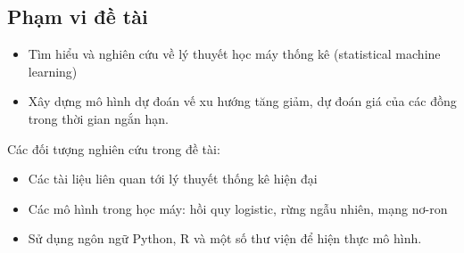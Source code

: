 \subsection{Phạm vi đề tài}
\begin{itemize}
\item Tìm hiểu và nghiên cứu về lý thuyết học máy thống kê (statistical machine learning)
\item Xây dựng mô hình dự đoán vế xu hướng tăng giảm, dự đoán giá của các đồng trong thời gian ngắn hạn.
\end{itemize}
Các đối tượng nghiên cứu trong đề tài:
\begin{itemize}
\item Các tài liệu liên quan tới lý thuyết thống kê hiện đại
\item Các mô hình trong học máy: hồi quy logistic, rừng ngẫu nhiên, mạng nơ-ron
\item Sử dụng ngôn ngữ Python, R và một số thư viện để hiện thực mô hình.
\end{itemize}



